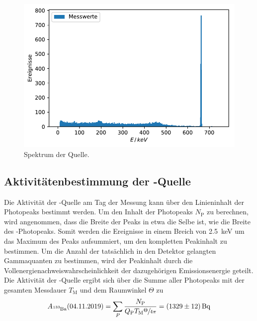 \begin{figure}[H]
  \centering
  \includegraphics[width=.9\textwidth]{../Plots/Cs_Spektrum.pdf}
  \caption{Spektrum der  Quelle.}
  \label{fig:Cs_Spektrum}
\end{figure}


\subsection{Aktivitätenbestimmung der -Quelle} \label{sec:Ba}

Die Aktivität der -Quelle am Tag der Messung kann über den Linieninhalt der Photopeaks bestimmt werden.
Um den Inhalt der Photopeaks $N_\text{P}$ zu berechnen, wird angenommen, dass die Breite der Peaks in etwa die Selbe ist, wie die Breite des -Photopeaks.
Somit werden die Ereignisse in einem Breich von \SI{2.5}{\kilo\electronvolt} um das Maximum des Peaks aufsummiert, um den kompletten Peakinhalt zu bestimmen.
Um die Anzahl der tatsächlich in den Detektor gelangten Gammaquanten zu bestimmen, wird der Peakinhalt durch die Vollenergienachweiswahrscheinlichkeit der dazugehörigen Emissionsenergie geteilt.
Die Aktivität der -Quelle ergibt sich über die Summe aller Photopeaks mit der gesamten Messdauer $T_\text{M}$ und dem Raumwinkel $\Theta$ zu
\begin{equation}
  A_\text{\ce{^133Ba}}(04.11.2019) = \sum_{P} \frac{N_\text{P}}{Q_\text{P} T_\text{M} \sfrac{\Theta}{4\pi}} = \SI{1329(12)}{\becquerel}
  \label{eqn:Act_Ba}
\end{equation}

